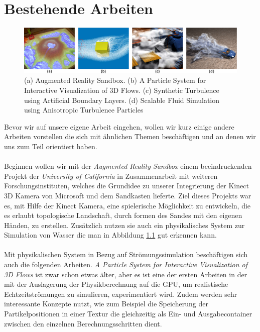\chapter{Bestehende Arbeiten}
\begin{Spacing}{\mylinespace}
\begin{figure}[h!]
	\centering
	\includegraphics[width=\textwidth]{graphics/relatedWork.png}
	\caption{(a) Augmented Reality Sandbox. (b) A Particle System
for Interactive Visualization of 3D Flows. (c) Synthetic Turbulence using Artificial Boundary Layers. (d) Scalable Fluid Simulation using Anisotropic Turbulence Particles}
	\label{fig:relatedWork}
\end{figure}
Bevor wir auf unsere eigene Arbeit eingehen, wollen wir kurz einige andere Arbeiten vorstellen die sich mit ähnlichen Themen beschäftigen und an denen wir uns zum Teil orientiert haben.
\\\\
Beginnen wollen wir mit der \textit{Augmented Reality Sandbox} \cite{Kreylos2010} einem beeindruckenden Projekt der \textit{University of California} in Zusammenarbeit mit weiteren Forschungsinstituten, welches die Grundidee zu unserer Integrierung der Kinect 3D Kamera von Microsoft und dem Sandkasten lieferte. Ziel dieses Projekts war es, mit Hilfe der Kinect Kamera, eine spielerische Möglichkeit zu entwickeln, die es erlaubt topologische Landschaft, durch formen des Sandes mit den eigenen Händen, zu erstellen. Zusätzlich nutzen sie auch ein physikalisches System zur Simulation von Wasser die man in Abbildung \ref{fig:relatedWork} gut erkennen kann.
\\\\
Mit physikalischen System in Bezug auf Strömungssimulation beschäftigen sich auch die folgenden Arbeiten. \textit{A Particle System
for Interactive Visualization of 3D Flows} \cite{Krueger2005} ist zwar schon etwas älter, aber es ist eine der ersten Arbeiten in der mit der Auslagerung der Physikberechnung auf die GPU, um realistische Echtzeitströmungen zu simulieren, experimentiert wird. Zudem werden sehr interessante Konzepte nutzt, wie zum Beispiel die Speicherung der Partikelpositionen in einer Textur die gleichzeitig als Ein- und Ausgabecontainer zwischen den einzelnen Berechnungsschritten dient.

\end{Spacing}
